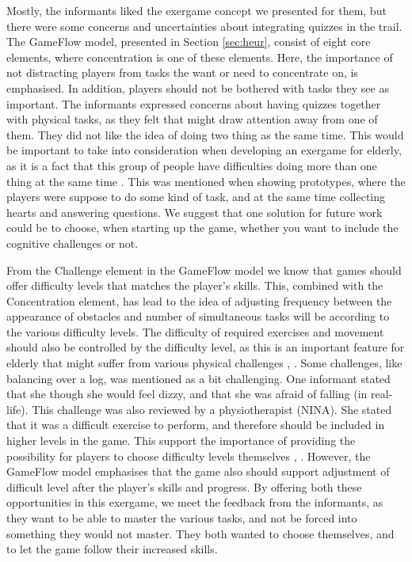 Mostly, the informants liked the exergame concept we presented for them, but there were some concerns and uncertainties about integrating quizzes in the trail. The GameFlow model, presented in Section \ref{sec:heur}, consist of eight core elements, where concentration is one of these elements. Here, the importance of not distracting players from tasks the want or need to concentrate on, is emphasised. In addition, players should not be bothered with tasks they see as important. The informants expressed concerns about having quizzes together with physical tasks, as they felt that might draw attention away from one of them. They did not like the idea of doing two thing as the same time. This would be important to take into consideration when developing an exergame for elderly, as it is a fact that this group of people have difficulties doing more than one thing at the same time \cite{bruin}. This was mentioned when showing prototypes, where the players were suppose to do some kind of task, and at the same time collecting hearts and answering questions. We suggest that one solution for future work could be to choose, when starting up the game, whether you want to include the cognitive challenges or not. 

From the Challenge element in the GameFlow model we know that games should offer difficulty levels that matches the player's skills. This, combined with the Concentration element, has lead to the idea of adjusting frequency between the appearance of obstacles and number of simultaneous tasks will be according to the various difficulty levels. The difficulty of required exercises and movement should also be controlled by the difficulty level, as this is an important feature for elderly that might suffer from various physical challenges \cite{gregor}, \cite{gerling1}. Some challenges, like balancing over a log, was mentioned as a bit challenging. One informant stated that she though she would feel dizzy, and that she was afraid of falling (in real-life). This challenge was also reviewed by a physiotherapist (NINA). She stated that it was a difficult exercise to perform, and therefore should be included in higher levels in the game. This support the importance of providing the possibility for players to choose difficulty levels themselves \cite{gregor}, \cite{gerling1}. However, the GameFlow model emphasises that the game also should support adjustment of difficult level after the player's skills and progress. By offering both these opportunities in this exergame, we meet the feedback from the informants, as they want to be able to master the various tasks, and not be forced into something they would not master. They both wanted to choose themselves, and to let the game follow their increased skills. 

